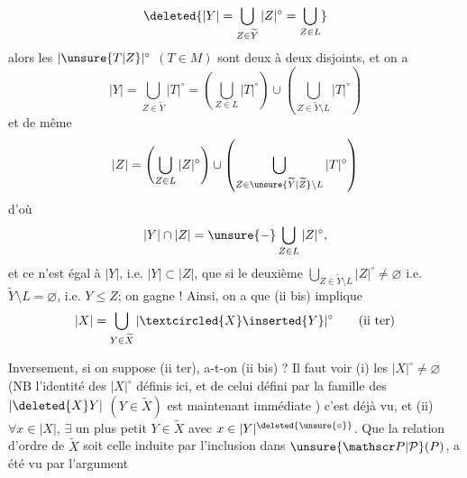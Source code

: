 
\[
\deleted{|Y|=\bigcup_{Z\in\widetilde Y}|Z|^{\circ}=\bigcup_{Z\in L}}
\]
alors les  $|\unsure{T|Z}|^{\circ}$ $(T\in M)$ sont  deux à deux disjoints,  et on a
\[
|Y|=\bigcup_{Z\in\widetilde Y}|T|^{\circ}
=\left(\bigcup_{Z\in L}|T|^{\circ}\right)\cup
\left(\bigcup_{Z\in\widetilde Y\setminus L}|T|^{\circ}\right)
\]
et de même
\[
|Z|=\left(\bigcup_{Z\in L}|Z|^{\circ}\right)\cup
\left(\bigcup_{Z\in\unsure{\widetilde Y|\widetilde Z}\setminus L}|T|^{\circ}\right)
\]
d'où
\[
|Y|\cap|Z|=\unsure{-}\bigcup_{Z\in L}|Z|^{\circ},
\]
et ce n'est égal à $|Y|$, i.e. $|Y|\subset|Z|$, que si le deuxième  $\bigcup_{Z\in\widetilde Y\setminus L}|Z|^{\circ}\ne\varnothing$ i.e. $\widetilde Y\setminus L=\varnothing$, i.e. $Y\leq Z$;  on gagne ! Ainsi, on a que (ii bis)  implique
\[
|X|=\bigcup_{Y\in\widetilde X}|\textcircled{X}\inserted{Y}|^{\circ}\tag*{(ii ter)}
\]
\margin{$\unsure{(\star)}\longrightarrow$}

Inversement, si on suppose (ii ter), a-t-on (ii bis) ?
Il faut voir (i) les $|X|^{\circ}\ne\varnothing$ (NB l'identité des $|X|^{\circ}$ définis ici, et de celui défini par la famille des $|\deleted{X}Y|$ $(Y\in\widetilde X)$ est maintenant immédiate ) c'est déjà vu, et (ii) $\forall x\in|X|$, $\exists$ un plus petit $Y\in\widetilde X$ avec $x\in|Y|^{\deleted{\unsure{\circ}}}$. Que la relation d'ordre de $\widetilde X$ soit celle induite par l'inclusion dans $\unsure{\mathscr P|\mathcal P}(P)$, a été vu par l'argument
